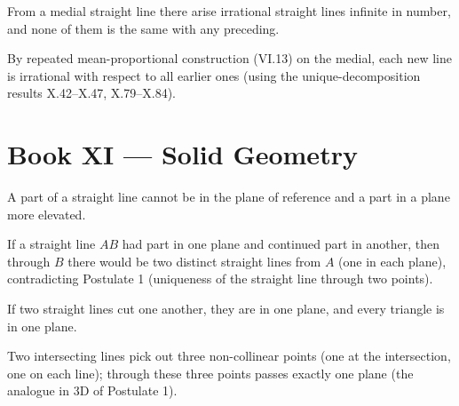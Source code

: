 \documentclass{rrxiv}
\begin{document}
\begin{claim}
\label{prop:X.115}
From a medial straight line there arise irrational straight lines
infinite in number, and none of them is the same with any preceding.
\end{claim}
\begin{evidence}[Proof of X.115]
\label{ev:X.115}
By repeated mean-proportional construction (VI.13) on the medial,
each new line is irrational with respect to all earlier ones (using
the unique-decomposition results X.42--X.47, X.79--X.84).
\end{evidence}
%
%

\section{Book XI --- Solid Geometry}
\label{sec:book-XI}

\begin{claim}
\label{prop:XI.1}
A part of a straight line cannot be in the plane of reference and a
part in a plane more elevated.
\end{claim}
\begin{evidence}[Proof of XI.1]
\label{ev:XI.1}
If a straight line $AB$ had part in one plane and continued part in
another, then through $B$ there would be two distinct straight lines
from $A$ (one in each plane), contradicting Postulate 1 (uniqueness
of the straight line through two points).
\end{evidence}

\begin{claim}
\label{prop:XI.2}
If two straight lines cut one another, they are in one plane, and
every triangle is in one plane.
\end{claim}
\begin{evidence}[Proof of XI.2]
\label{ev:XI.2}
Two intersecting lines pick out three non-collinear points (one at
the intersection, one on each line); through these three points
passes exactly one plane (the analogue in 3D of Postulate 1).
\end{evidence}
\end{document}
